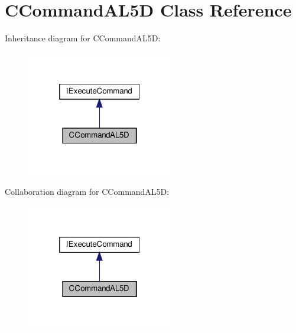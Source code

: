 \hypertarget{classCCommandAL5D}{}\section{C\+Command\+A\+L5D Class Reference}
\label{classCCommandAL5D}


Inheritance diagram for C\+Command\+A\+L5D\+:\nopagebreak
\begin{figure}[H]
\begin{center}
\leavevmode
\includegraphics[width=181pt]{classCCommandAL5D__inherit__graph}
\end{center}
\end{figure}


Collaboration diagram for C\+Command\+A\+L5D\+:\nopagebreak
\begin{figure}[H]
\begin{center}
\leavevmode
\includegraphics[width=181pt]{classCCommandAL5D__coll__graph}
\end{center}
\end{figure}
